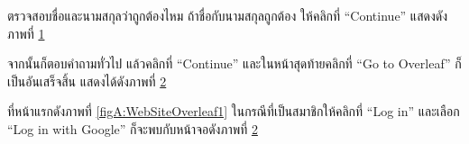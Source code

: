 \begin{mycustomenum2}
\begin{mycustomenum2}
\begin{mycustomenum2}
            \item ตรวจสอบชื่อและนามสกุลว่าถูกต้องไหม ถ้าชื่อกับนามสกุลถูกต้อง ให้คลิกที่ \enquote{Continue} แสดงดังภาพที่ \ref{figA:WebSiteOverleaf6} \vspace{0.5em}

\begin{figure}[htbp]
\centering
{}
\caption{}
\label{figA:WebSiteOverleaf6}
\end{figure}

            \item จากนั้นก็ตอบคำถามทั่วไป แล้วคลิกที่ \enquote{Continue} และในหน้าสุดท้ายคลิกที่ \enquote{Go to Overleaf} ก็เป็นอันเสร็จสิ้น แสดงได้ดังภาพที่ \ref{figA:WebSiteOverleaf7} 

\begin{figure}[htbp]
\centering
{}
\caption{}
\label{figA:WebSiteOverleaf7}
\end{figure}
                
        \end{mycustomenum2}   
    \end{mycustomenum2}   
    \item ที่หน้าแรกดังภาพที่ \ref{figA:WebSiteOverleaf1} ในกรณีที่เป็นสมาชิกให้คลิกที่ \enquote{Log in} และเลือก \enquote{Log in with Google} ก็จะพบกับหน้าจอดังภาพที่ \ref{figA:WebSiteOverleaf7}
    

\end{mycustomenum2}
